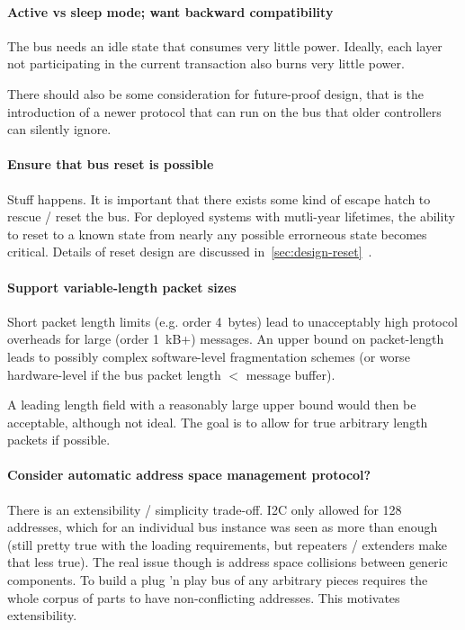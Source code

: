 \paragraph{Active vs sleep mode; want backward compatibility}
The bus needs an idle state that consumes very little power. Ideally, each
layer not participating in the current transaction also burns very little
power.

There should also be some consideration for future-proof design, that is the
introduction of a newer protocol that can run on the bus that older
controllers can silently ignore.

\paragraph{Ensure that bus reset is possible}
Stuff happens. It is important that there exists some kind of escape hatch to
rescue / reset the bus. For deployed systems with mutli-year lifetimes, the
ability to reset to a known state from nearly any possible errorneous state
becomes critical. Details of reset design are discussed
in~\ref{sec:design-reset}~.

\paragraph{Support variable-length packet sizes}
Short packet length limits (e.g. order 4~bytes) lead to unacceptably high
protocol overheads for large (order 1~kB+) messages. An upper bound on
packet-length leads to possibly complex software-level fragmentation schemes
(or worse hardware-level if the bus packet length $<$ message buffer).

A leading length field with a reasonably large upper bound would then be
acceptable, although not ideal. The goal is to allow for true arbitrary length
packets if possible.

\paragraph{Consider automatic address space management protocol?}
There is an extensibility / simplicity trade-off. I2C only allowed for 128
addresses, which for an individual bus instance was seen as more than enough
(still pretty true with the loading requirements, but repeaters / extenders
make that less true). The real issue though is address space collisions
between generic components. To build a plug 'n play bus of any arbitrary
pieces requires the whole corpus of parts to have non-conflicting addresses.
This motivates extensibility.

